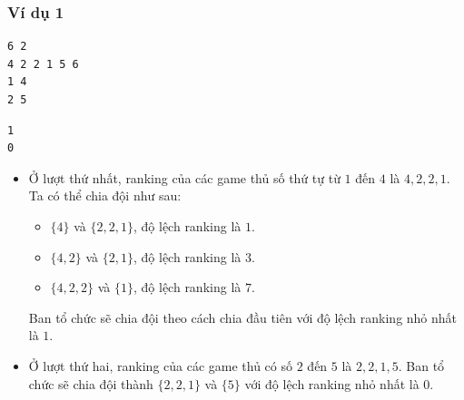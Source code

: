 
\subsubsection*{Ví dụ 1}
\begin{makesample}
\begin{lstlisting}
6 2
4 2 2 1 5 6
1 4
2 5
\end{lstlisting}
\nextsample
\begin{lstlisting}
1
0
\end{lstlisting}
\end{makesample}

\begin{explain}
\begin{itemize}
    \item Ở lượt thứ nhất, ranking của các game thủ số thứ tự từ $1$ đến $4$ là $4, 2, 2, 1$. Ta có thể chia đội như sau:
    \begin{itemize}
        \item $\{4\}$ và $\{2, 2, 1\}$, độ lệch ranking là $1$.
        \item $\{4, 2\}$ và $\{2, 1\}$, độ lệch ranking là $3$.
        \item $\{4, 2, 2\}$ và $\{1\}$, độ lệch ranking là $7$.
    \end{itemize}
    Ban tổ chức sẽ chia đội theo cách chia đầu tiên với độ lệch ranking nhỏ nhất là $1$.
    \item Ở lượt thứ hai, ranking của các game thủ có số $2$ đến $5$ là $2, 2, 1, 5$. Ban tổ chức sẽ chia đội thành $\{2, 2, 1\}$ và $\{5\}$ với độ lệch ranking nhỏ nhất là $0$.
\end{itemize}
\end{explain}